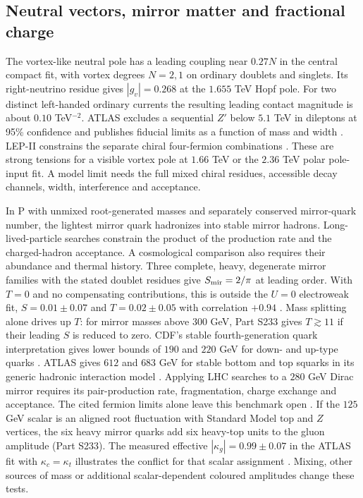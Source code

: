 \documentclass[aps,prd,reprint,onecolumn,nofootinbib,amsmath,amssymb]{revtex4-2}
\begin{document}
\subsection{Neutral vectors, mirror matter and fractional charge}
The vortex-like neutral pole has a leading coupling near $0.27N$ in the central compact fit, with vortex degrees $N=2,1$ on ordinary doublets and singlets. Its right-neutrino residue gives $|g_v|=0.268$ at the $1.655$ TeV Hopf pole. For two distinct left-handed ordinary currents the resulting leading contact magnitude is about $0.10$ TeV$^{-2}$. ATLAS excludes a sequential $Z'$ below $5.1$ TeV in dileptons at 95\% confidence and publishes fiducial limits as a function of mass and width \cite{ATLAS2019Dileptons}. LEP-II constrains the separate chiral four-fermion combinations \cite{LEP2013Pairs}. These are strong tensions for a visible vortex pole at $1.66$ TeV or the $2.36$ TeV polar pole-input fit. A model limit needs the full mixed chiral residues, accessible decay channels, width, interference and acceptance.

In P with unmixed root-generated masses and separately conserved mirror-quark number, the lightest mirror quark hadronizes into stable mirror hadrons. Long-lived-particle searches constrain the product of the production rate and the charged-hadron acceptance. A cosmological comparison also requires their abundance and thermal history. Three complete, heavy, degenerate mirror families with the stated doublet residues give $S_{\rm mir}=2/\pi$ at leading order. With $T=0$ and no compensating contributions, this is outside the $U=0$ electroweak fit, $S=0.01\pm0.07$ and $T=0.02\pm0.05$ with correlation $+0.94$ \cite{GfitterOblique}. Mass splitting alone drives up $T$: for mirror masses above $300$ GeV, Part S233 gives $T\gtrsim 11$ if their leading $S$ is reduced to zero. CDF's stable fourth-generation quark interpretation gives lower bounds of $190$ and $220$ GeV for down- and up-type quarks \cite{CDFStableQuark}. ATLAS gives $612$ and $683$ GeV for stable bottom and top squarks in its generic hadronic interaction model \cite{ATLASTripletHadrons}. Applying LHC searches to a $280$ GeV Dirac mirror requires its pair-production rate, fragmentation, charge exchange and acceptance. The cited fermion limits alone leave this benchmark open \cite{ATLAS2023LongLived}. If the $125$ GeV scalar is an aligned root fluctuation with Standard Model top and $Z$ vertices, the six heavy mirror quarks add six heavy-top units to the gluon amplitude (Part S233). The measured effective $|\kappa_g|=0.99\pm0.07$ in the ATLAS fit with $\kappa_c=\kappa_t$ illustrates the conflict for that scalar assignment \cite{ATLAS2026Higgs}. Mixing, other sources of mass or additional scalar-dependent coloured amplitudes change these tests.
\end{document}
